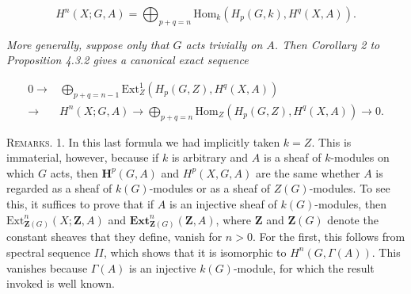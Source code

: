 \[
\tag{4.4.2}
H^n(X;G,A)=
\bigoplus_{p+q=n}
\mathrm{Hom}_k(H_p(G,k),H^q(X,A)).
\]

\textit{More generally, suppose only that $G$ acts trivially on $A$. Then
Corollary \textup{2} to Proposition \textup{4.3.2} gives a canonical exact sequence}

\[
\tag{4.4.3}
\begin{aligned}
0\to{}&
\bigoplus_{p+q=n-1}
\mathrm{Ext}_{Z}^1(H_p(G,Z),H^q(X,A))\\
\to{}&H^n(X;G,A)
\to
\bigoplus_{p+q=n}
\mathrm{Hom}_{Z}(H_p(G,Z),H^q(X,A))
\to0.
\end{aligned}
\]

\textsc{Remarks.} 1. In this last formula we had implicitly taken
$k=Z$. This is immaterial, however, because if $k$ is arbitrary and
$A$ is a sheaf of $k$-modules on which $G$ acts, then $\mathbf H^p(G,A)$ and
$H^p(X,G,A)$ are the same whether $A$ is regarded as a sheaf of
$k(G)$-modules or as a sheaf of $Z(G)$-modules.
To see this, it suffices to prove that if $A$ is an injective sheaf of
$k(G)$-modules, then $\mathrm{Ext}_{\mathbf Z(G)}^n(X;\mathbf Z,A)$ and
$\mathbf{Ext}_{\mathbf Z(G)}^n(\mathbf Z,A)$, where $\mathbf Z$ and
$\mathbf Z(G)$ denote the constant sheaves that they define, vanish for
$n>0$. For the first, this follows from spectral sequence $II$, which shows
that it is isomorphic to $H^n(G,\Gamma(A))$. This vanishes because $\Gamma(A)$
is an injective $k(G)$-module, for which the result invoked is well known.

